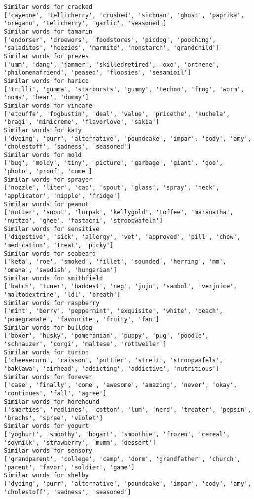 \documentclass[11pt]{article}
\begin{document}
\begin{Verbatim}[commandchars=\\\{\}]
Similar words for cracked
['cayenne', 'tellicherry', 'crushed', 'sichuan', 'ghost', 'paprika', 'oregano', 'telicherry', 'garlic', 'seasoned']
Similar words for tamarin
['endorser', 'droewors', 'foodstores', 'picdog', 'pooching', 'saladitos', 'heezies', 'marmite', 'nonstarch', 'grandchild']
Similar words for prezes
['umm', 'dang', 'jammer', 'skilledretired', 'oxo', 'orthene', 'philomenafriend', 'peased', 'floosies', 'sesamioil']
Similar words for harico
['trilli', 'gumma', 'starbursts', 'gummy', 'techno', 'frog', 'worm', 'noms', 'bear', 'dummy']
Similar words for vincafe
['etouffe', 'fogbustin', 'deal', 'value', 'pricethe', 'kuchela', 'bragi', 'mimicreme', 'flavorlove', 'sakia']
Similar words for katy
['dyeing', 'purr', 'alternative', 'poundcake', 'impar', 'cody', 'amy', 'cholestoff', 'sadness', 'seasoned']
Similar words for mold
['bug', 'moldy', 'tiny', 'picture', 'garbage', 'giant', 'goo', 'photo', 'proof', 'come']
Similar words for sprayer
['nozzle', 'liter', 'cap', 'spout', 'glass', 'spray', 'neck', 'applicator', 'nipple', 'fridge']
Similar words for peanut
['nutter', 'snout', 'lurpak', 'kellygold', 'toffee', 'maranatha', 'nuttzo', 'ghee', 'fastachi', 'stroopwafeln']
Similar words for sensitive
['digestive', 'sick', 'allergy', 'vet', 'approved', 'pill', 'chow', 'medication', 'treat', 'picky']
Similar words for seabeard
['keta', 'roe', 'smoked', 'fillet', 'sounded', 'herring', 'mm', 'omaha', 'swedish', 'hungarian']
Similar words for smithfield
['batch', 'tuner', 'baddest', 'neg', 'juju', 'sambol', 'verjuice', 'maltodextrine', 'ldl', 'breath']
Similar words for raspberry
['mint', 'berry', 'peppermint', 'exquisite', 'white', 'peach', 'pomegranate', 'favourite', 'fruity', 'fan']
Similar words for bulldog
['boxer', 'husky', 'pomeranian', 'puppy', 'pug', 'poodle', 'schnauzer', 'corgi', 'maltese', 'rottweiler']
Similar words for turion
['cheesecorn', 'caisson', 'puttier', 'streit', 'stroopwafels', 'baklawa', 'airhead', 'addicting', 'addictive', 'nutritious']
Similar words for forever
['case', 'finally', 'come', 'awesome', 'amazing', 'never', 'okay', 'continues', 'fall', 'agree']
Similar words for horehound
['smarties', 'redlines', 'cotton', 'lum', 'nerd', 'treater', 'pepsin', 'brachs', 'spree', 'violet']
Similar words for yogurt
['yoghurt', 'smoothy', 'bogart', 'smoothie', 'frozen', 'cereal', 'soymilk', 'strawberry', 'mumm', 'dessert']
Similar words for sensory
['grandparent', 'college', 'camp', 'dorm', 'grandfather', 'church', 'parent', 'favor', 'soldier', 'game']
Similar words for shelby
['dyeing', 'purr', 'alternative', 'poundcake', 'impar', 'cody', 'amy', 'cholestoff', 'sadness', 'seasoned']

\end{Verbatim}
\end{document}
